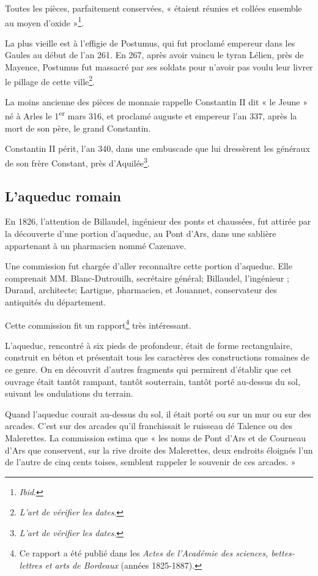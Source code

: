 \documentclass[a4paper,11pt]{book}
\begin{document}
Toutes les pièces, parfaitement conservées, « étaient réunies et collées ensemble au moyen d'oxide »\footnote{\textit{Ibid}.}.

La plus vieille est à l'effigie de Postumus, qui fut proclamé empereur dans les Gaules au début de l'an 261. En 267, après avoir vaincu le tyran Lélien, près de Mayence, Postumus fut massacré par ses soldats pour n'avoir pas voulu leur livrer le pillage de cette ville\footnote{\textit{L'art de vérifier les dates}.}.

La moins ancienne des pièces de monnaie rappelle Constantin II dit « le Jeune » né à Arles le 1\textsuperscript{er} mars 316, et proclamé auguste et empereur l'an 337, après la mort de son père, le grand Constantin.

Constantin II périt, l'an 340, dans une embuscade que lui dressèrent les généraux de son frère Constant, près d'Aquilée\footnote{\textit{L'art de vérifier les dates}.}.

\subsection{L'aqueduc romain}

En 1826, l'attention de Billaudel, ingénieur des ponts et chaussées, fut attirée par la découverte d'une portion d'aqueduc, au Pont d'Ars, dans une sablière appartenant à un pharmacien nommé Cazenave.

Une commission fut chargée d'aller reconnaître cette portion d'aqueduc. Elle comprenait MM. Blanc-Dutrouilh, secrétaire général; Billaudel, l'ingénieur ; Durand, architecte; Lartigue, pharmacien, et Jouannet, conservateur des antiquités du département.

Cette commission fit un rapport\footnote{Ce rapport a été publié dans les \textit{Actes de l'Académie des sciences, bettes-lettres et arts de Bordeaux} (années 1825-1887).} très intéressant.

L'aqueduc, rencontré à six pieds de profondeur, était de forme rectangulaire, construit en béton et présentait tous les caractères des constructions romaines de ce genre. On en découvrit d'autres fragments qui permirent d'établir que cet ouvrage était tantôt rampant, tantôt souterrain, tantôt porté au-dessus du sol, suivant les ondulations du terrain.

Quand l'aqueduc courait au-dessus du sol, il était porté ou sur un mur ou sur des arcades. C'est sur des arcades qu'il franchissait le ruisseau dé Talence ou des Malerettes. La commission estima que « les noms de Pont d'Ars et de Courneau d'Ars que conservent, sur la rive droite des Malerettes, deux endroits éloignés l'un de l'autre de cinq cents toises, semblent rappeler le souvenir de ces arcades. »
\end{document}
